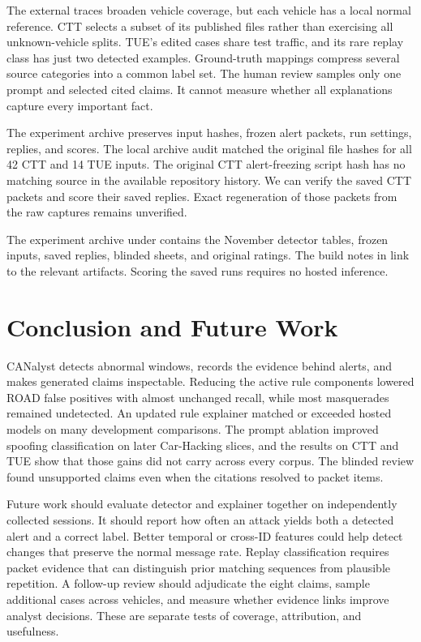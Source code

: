 \documentclass[sigconf,pbalance=true]{acmart}
\begin{document}
The external traces broaden vehicle coverage, but each vehicle has a local normal reference. CTT selects a subset of its published files rather than exercising all unknown-vehicle splits. TUE's edited cases share test traffic, and its rare replay class has just two detected examples. Ground-truth mappings compress several source categories into a common label set. The human review samples only one prompt and selected cited claims. It cannot measure whether all explanations capture every important fact.

The experiment archive preserves input hashes, frozen alert packets, run settings, replies, and scores. The local archive audit matched the original file hashes for all 42 CTT and 14 TUE inputs. The original CTT alert-freezing script hash has no matching source in the available repository history. We can verify the saved CTT packets and score their saved replies. Exact regeneration of those packets from the raw captures remains unverified.

The experiment archive under  contains the November detector tables, frozen inputs, saved replies, blinded sheets, and original ratings. The build notes in  link to the relevant artifacts. Scoring the saved runs requires no hosted inference.

\section{Conclusion and Future Work}

CANalyst detects abnormal windows, records the evidence behind alerts, and makes generated claims inspectable. Reducing the active rule components lowered ROAD false positives with almost unchanged recall, while most masquerades remained undetected. An updated rule explainer matched or exceeded hosted models on many development comparisons. The prompt ablation improved spoofing classification on later Car-Hacking slices, and the results on CTT and TUE show that those gains did not carry across every corpus. The blinded review found unsupported claims even when the citations resolved to packet items.

Future work should evaluate detector and explainer together on independently collected sessions. It should report how often an attack yields both a detected alert and a correct label. Better temporal or cross-ID features could help detect changes that preserve the normal message rate. Replay classification requires packet evidence that can distinguish prior matching sequences from plausible repetition. A follow-up review should adjudicate the eight claims, sample additional cases across vehicles, and measure whether evidence links improve analyst decisions. These are separate tests of coverage, attribution, and usefulness.



\end{document}
